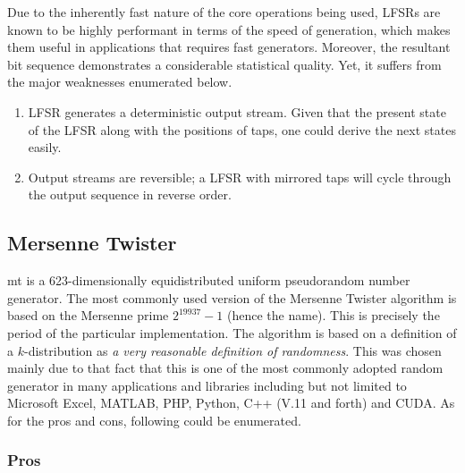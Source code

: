 Due to the inherently fast nature of the core operations being used, LFSRs are known to be highly performant in terms of the speed of generation, which makes them useful in applications that requires fast generators. Moreover, the resultant bit sequence demonstrates a considerable statistical quality. Yet, it suffers from the major weaknesses enumerated below.

\begin{enumerate}
    \item LFSR generates a deterministic output stream. Given that the present state of the LFSR along with the positions of taps, one could derive the next states easily.
    \item Output streams are reversible; a LFSR with mirrored taps will cycle through the output sequence in reverse order.
\end{enumerate}

\subsection{Mersenne Twister}

\acrfull{mt} is a 623-dimensionally equidistributed uniform pseudorandom number generator. The most commonly used version of the Mersenne Twister algorithm is based on the Mersenne prime $2^{19937}−1$ (hence the name). This is precisely the period of the particular implementation. The algorithm is based on a definition of a $k$-distribution as \textit{a very reasonable definition of randomness}\cite{art_mt_tomacs_urng}. This was chosen mainly due to that fact that this is one of the most commonly adopted random generator in many applications and libraries including but not limited to Microsoft Excel\cite{misc_merald_excel}, MATLAB\cite{web_matworks_randstream}, PHP\cite{web_php_manual_mtrand}, Python\cite{web_python2_manual_prng}\cite{web_python3_manual_prng}, C++ (V.11 and forth)\cite{rep_rand_cpp} and CUDA\cite{web_cuda_rand}. As for the pros and cons, following could be enumerated.

\subsubsection{Pros}

